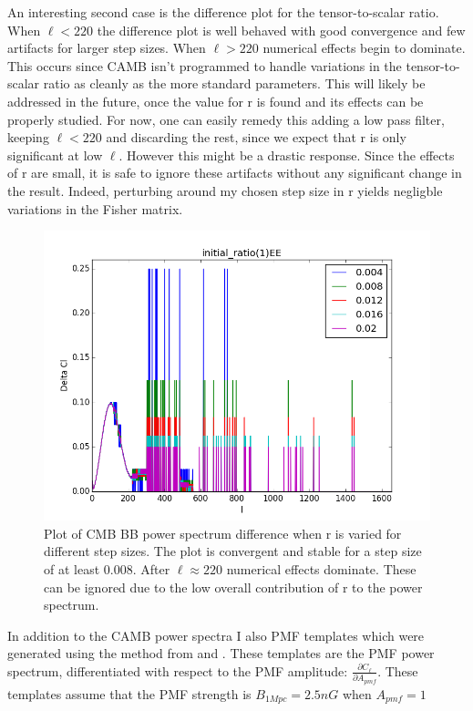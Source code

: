  
An interesting second case is the difference plot for the tensor-to-scalar ratio. When $\ell < 220$ the difference plot is well behaved with good convergence and few artifacts for larger step sizes. When $\ell > 220$ numerical effects begin to dominate. This occurs since CAMB isn't programmed to handle variations in the tensor-to-scalar ratio as cleanly as the more standard parameters. This will likely be addressed in the future, once the value for r is found and its effects can be properly studied. For now, one can easily remedy this adding a low pass filter, keeping $\ell < 220$ and discarding the rest, since we expect that r is only significant at low $\ell$. However this might be a drastic response. Since the effects of r are small, it is safe to ignore these artifacts without any significant change in the result. Indeed, perturbing around my chosen step size in r yields negligble variations in the Fisher matrix.

\begin{figure}[h]
\centering
\includegraphics[scale=0.75]{images/diffs/reez.png}
\caption{Plot of CMB BB power spectrum difference when r is varied for different step sizes. The plot is convergent and stable for a step size of at least 0.008. After $\ell \approx 220$ numerical effects dominate. These can be ignored due to the low overall contribution of r to the power spectrum.}
\label{fig:diffr}
\end{figure}
 
 
In addition to the CAMB power spectra I also PMF templates which were generated using the method from \cite{Ade:2015cao} and \cite{PhysRevD.80.023510}. These templates are the PMF power spectrum, differentiated with respect to the PMF amplitude: $\frac{\partial C_{\ell}}{\partial A_{pmf}}$.
These templates assume that the PMF strength is $B_{1Mpc} = 2.5nG$ when $A_{pmf} = 1$

